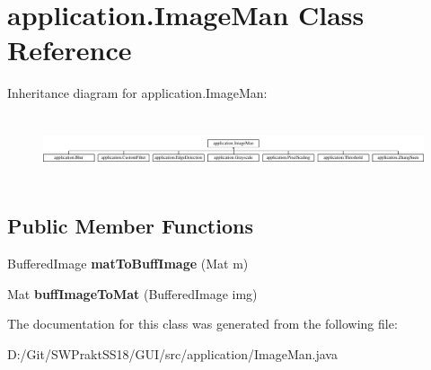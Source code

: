 \hypertarget{classapplication_1_1_image_man}{}\section{application.\+Image\+Man Class Reference}
\label{classapplication_1_1_image_man}
Inheritance diagram for application.\+Image\+Man\+:\begin{figure}[H]
\begin{center}
\leavevmode
\includegraphics[height=2.000000cm]{classapplication_1_1_image_man}
\end{center}
\end{figure}
\subsection*{Public Member Functions}
\begin{DoxyCompactItemize}
\item 
\mbox{\label{classapplication_1_1_image_man_aae0baacc6ca5c01021d2045a6cd3b2c7}} 
Buffered\+Image {\bfseries mat\+To\+Buff\+Image} (Mat m)
\item 
\mbox{\label{classapplication_1_1_image_man_aaa60d625c007f0cd250b92359c396287}} 
Mat {\bfseries buff\+Image\+To\+Mat} (Buffered\+Image img)
\end{DoxyCompactItemize}


The documentation for this class was generated from the following file\+:\begin{DoxyCompactItemize}
\item 
D\+:/\+Git/\+S\+W\+Prakt\+S\+S18/\+G\+U\+I/src/application/Image\+Man.\+java\end{DoxyCompactItemize}
